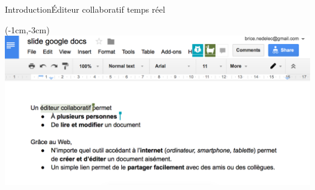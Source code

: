 \begin{frame}{Introduction}{Éditeur collaboratif temps réel}
    
  
  \begin{textblock*}{\textwidth}(-1cm,-3cm) 
    \includegraphics[width=1.19\textwidth]{img/googledocs3.png}
  \end{textblock*}


\end{frame}

